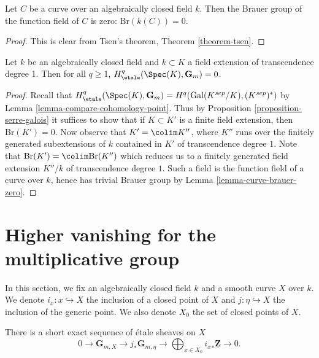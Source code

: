 \begin{lemma}
\label{lemma-curve-brauer-zero}
Let $C$ be a curve over an algebraically closed field $k$. Then
the Brauer group of the function field of $C$ is zero:
$\text{Br}(k(C)) = 0$.
\end{lemma}

\begin{proof}
This is clear from Tsen's theorem,
Theorem \ref{theorem-tsen}.
\end{proof}

\begin{lemma}
\label{lemma-cohomology-Gm-function-field-curve}
Let $k$ be an algebraically closed field and $k \subset K$ a field extension
of transcendence degree 1. Then for all $q \geq 1$,
$H_\etale^q(\Spec(K), \mathbf{G}_m) = 0$.
\end{lemma}

\begin{proof}
Recall that
$H_\etale^q(\Spec(K), \mathbf{G}_m) = H^q(\text{Gal}(K^{sep}/K), (K^{sep})^*)$
by Lemma \ref{lemma-compare-cohomology-point}.
Thus by Proposition \ref{proposition-serre-galois}
it suffices to show that if $K \subset K'$ is a finite field extension, then
$\text{Br}(K') = 0$. Now observe that $K' = \colim K''$, where $K''$ runs
over the finitely generated subextensions of $k$ contained in $K'$ of
transcendence degree $1$.
Note that $\text{Br}(K') = \colim \text{Br}(K'')$ which reduces us
to a finitely generated field extension $K''/k$ of transcendence
degree $1$. Such a field is the function field of a curve over $k$,
hence has trivial Brauer group by
Lemma \ref{lemma-curve-brauer-zero}.
\end{proof}






\section{Higher vanishing for the multiplicative group}
\label{section-higher-Gm}

\noindent
In this section, we fix an algebraically closed field $k$ and a smooth curve
$X$ over $k$. We denote $i_x : x \hookrightarrow X$ the inclusion of a closed
point of $X$ and $j : \eta \hookrightarrow X$ the inclusion of the generic
point. We also denote $X_0$ the set of closed points of $X$.

\begin{theorem}
\label{theorem-fundamental-exact-sequence}
There is a short exact sequence of \'etale sheaves on $X$
$$
0 \longrightarrow
\mathbf{G}_{m, X} \longrightarrow
j_* \mathbf{G}_{m, \eta} \longrightarrow
\bigoplus\nolimits_{x \in X_0} {i_x}_* \underline{\mathbf{Z}}
\longrightarrow 0.
$$
\end{theorem}

